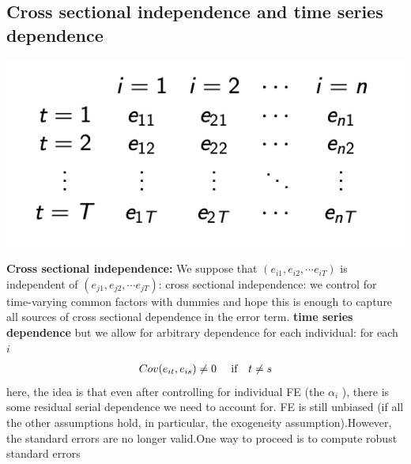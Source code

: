 \documentclass[a4paper,twoside,11pt]{article}
\begin{document}
\subsection{Cross sectional independence and time series dependence}
\begin{center}
\includegraphics[scale=0.5]{figure1.png}
\end{center}
\textbf{Cross sectional independence:}
\newline
We suppose that $(e_{i1}, e_{i2}, \cdots e_{iT})$ is independent of $(e_{j1}, e_{j2}, \cdots e_{jT})$: cross sectional independence:
\newline
\newline
we control for time-varying common factors with dummies and hope this is enough to capture all sources of cross sectional dependence in the error term.
\newline
\newline
\textbf{time series dependence}
\newline
but we allow for arbitrary dependence for each individual: for each $i$
\begin{equation*}
\begin{aligned}
Cov(e_{it}, e_{is}) \ne 0 \ \ \ \ \textmd{if} \ \ \ t \ne s
\end{aligned} 
\end{equation*}
here, the idea is that even after controlling for individual FE (the $\alpha_i$ ), there is some residual serial dependence we need to account for. \textcolor{NavyBlue}{FE is still unbiased (if all the other assumptions hold, in particular, the exogeneity assumption).However, the standard errors are no longer valid.One way to proceed is to compute robust standard errors}
\end{document}
